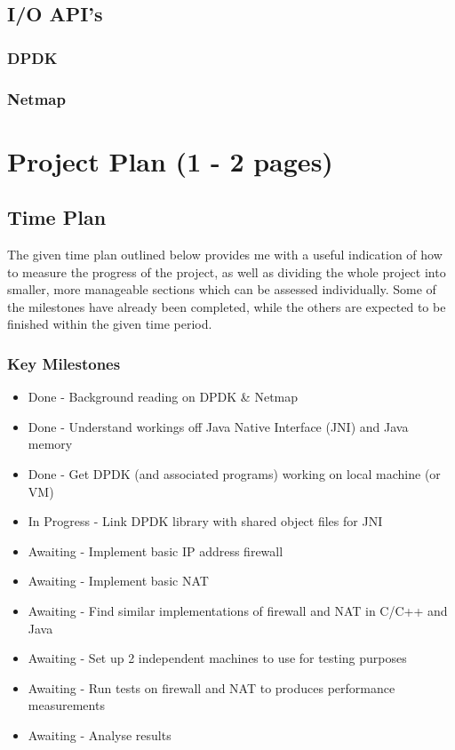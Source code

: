 \documentclass[a4paper, titlepage]{article}
\begin{document}
\subsection{I/O API's}
\subsubsection{DPDK}
\subsubsection{Netmap}

\newpage

\section{Project Plan (1 - 2 pages)}
\subsection{Time Plan}
The given time plan outlined below provides me with a useful indication of how to measure the progress of the project, as well as dividing the whole project into smaller, more manageable sections which can be assessed individually. Some of the milestones have already been completed, while the others are expected to be finished within the given time period.
\subsubsection{Key Milestones}
\begin{itemize}
	\item Done - Background reading on DPDK \& Netmap
	\item Done - Understand workings off Java Native Interface (JNI) and Java memory
	\item Done - Get DPDK (and associated programs) working on local machine (or VM)
	\item In Progress - Link DPDK library with shared object files for JNI
	\item Awaiting - Implement basic IP address firewall
	\item Awaiting - Implement basic NAT
	\item Awaiting - Find similar implementations of firewall and NAT in C/C++ and Java
	\item Awaiting - Set up 2 independent machines to use for testing purposes
	\item Awaiting - Run tests on firewall and NAT to produces performance measurements
	\item Awaiting - Analyse results
\end{itemize}
\end{document}
